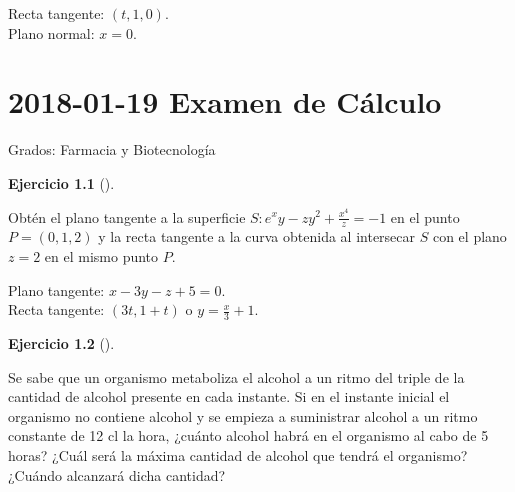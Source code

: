 \documentclass[
  a4paper,
]{scrreport}
\theoremstyle{definition}
\newtheorem{exercise}{Ejercicio}[chapter]
\theoremstyle{remark}
\begin{document}
\begin{tcolorbox}[enhanced jigsaw, opacitybacktitle=0.6, titlerule=0mm, bottomtitle=1mm, toptitle=1mm, breakable, bottomrule=.15mm, left=2mm, opacityback=0, toprule=.15mm, leftrule=.75mm, colframe=quarto-callout-tip-color-frame, coltitle=black, rightrule=.15mm, colback=white, title=\textcolor{quarto-callout-tip-color}{\faLightbulb}\hspace{0.5em}{Solución}, arc=.35mm, colbacktitle=quarto-callout-tip-color!10!white]

Recta tangente: \((t,1,0)\).\\
Plano normal: \(x=0\).

\end{tcolorbox}


\chapter{\texorpdfstring{2018-01-19 Examen de
Cálculo}{2018-01-19  Examen de Cálculo}}\label{examen-de-cuxe1lculo-3}

Grados: Farmacia y Biotecnología

\begin{exercise}[]\protect\hypertarget{exr-1}{}\label{exr-1}

Obtén el plano tangente a la superficie
\(S: e^xy-zy^2+\frac{x^4}{z}=-1\) en el punto \(P=(0,1,2)\) y la recta
tangente a la curva obtenida al intersecar \(S\) con el plano \(z=2\) en
el mismo punto \(P\).

\end{exercise}

\begin{tcolorbox}[enhanced jigsaw, opacitybacktitle=0.6, titlerule=0mm, bottomtitle=1mm, toptitle=1mm, breakable, bottomrule=.15mm, left=2mm, opacityback=0, toprule=.15mm, leftrule=.75mm, colframe=quarto-callout-tip-color-frame, coltitle=black, rightrule=.15mm, colback=white, title=\textcolor{quarto-callout-tip-color}{\faLightbulb}\hspace{0.5em}{Solución}, arc=.35mm, colbacktitle=quarto-callout-tip-color!10!white]

Plano tangente: \(x-3y-z+5=0\).\\
Recta tangente: \((3t,1+t)\) o \(y=\frac{x}{3}+1\).

\end{tcolorbox}

\begin{exercise}[]\protect\hypertarget{exr-2}{}\label{exr-2}

Se sabe que un organismo metaboliza el alcohol a un ritmo del triple de
la cantidad de alcohol presente en cada instante. Si en el instante
inicial el organismo no contiene alcohol y se empieza a suministrar
alcohol a un ritmo constante de 12 cl la hora, ¿cuánto alcohol habrá en
el organismo al cabo de 5 horas? ¿Cuál será la máxima cantidad de
alcohol que tendrá el organismo? ¿Cuándo alcanzará dicha cantidad?

\end{exercise}
\end{document}
